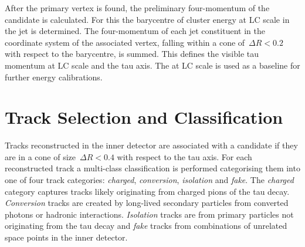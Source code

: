 After the primary vertex is found, the preliminary four-momentum of the
\tauhadvis candidate is calculated.
For this the barycentre of cluster energy at LC scale in the jet is determined.
The four-momentum of each jet constituent in the coordinate system of the
associated vertex, falling within a cone of~$\Delta R < 0.2$ with respect to the
barycentre, is summed. This defines the visible tau momentum at LC scale and the
tau axis. The \tauhadvis \pt at LC scale is used as a baseline for further
energy calibrations.

\section{Track Selection and Classification}
\label{sec:reco_track_sel_classif}
%
Tracks reconstructed in the inner detector are associated with a \tauhadvis
candidate if they are in a cone of size~$\Delta R < 0.4$ with respect to the tau
axis.
%
%
%
For each reconstructed track a multi-class classification is performed
categorising them into one of four track categories: \emph{charged},
\emph{conversion}, \emph{isolation} and \emph{fake}. The \emph{charged} category
captures tracks likely originating from charged pions of the tau decay.
\emph{Conversion} tracks are created by long-lived secondary particles from
converted photons or hadronic interactions. \emph{Isolation} tracks are from
primary particles not originating from the tau decay and \emph{fake} tracks from
combinations of unrelated space points in the inner detector.

